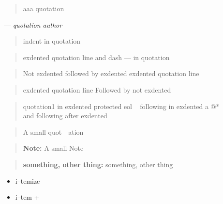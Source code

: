 \documentclass{book}
\begin{document}
\begin{quote}
aaa quotation
\end{quote}
\begin{center}
--- \emph{quotation author}
\end{center}

\begin{quote}
indent in quotation
\end{quote}

\begin{quote}
exdented quotation line   and dash --- in quotation
\end{quote}

\begin{quote}
Not exdented followed by exdented
exdented quotation line
\end{quote}

\begin{quote}
exdented quotation line
Followed by not exdented 
\end{quote}

\begin{quote}
quotation1
in exdented protected eol \ {}
following
in exdented a @* \leavevmode{}\\ and following
after exdented
\end{quote}

\begin{quote}
\begin{footnotesize}
A small quot---ation
\end{footnotesize}
\end{quote}

\begin{quote}
\begin{footnotesize}
\textbf{Note:} A small Note
\end{footnotesize}
\end{quote}

\begin{quote}
\begin{footnotesize}
\textbf{something, other thing:} something, other thing
\end{footnotesize}
\end{quote}

\begin{itemize}
\item i--temize
\end{itemize}

\begin{itemize}[label=+]
\item i--tem +
\end{itemize}
\end{document}
